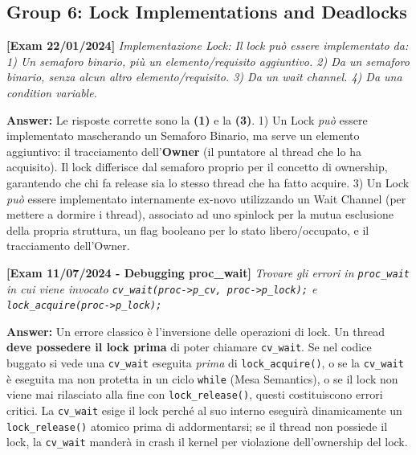 \newpage
\subsection*{Group 6: Lock Implementations and Deadlocks}

\textbf{[Exam 22/01/2024]}
\textit{Implementazione Lock: Il lock può essere implementato da: 1) Un semaforo binario, più un elemento/requisito aggiuntivo. 2) Da un semaforo binario, senza alcun altro elemento/requisito. 3) Da un wait channel. 4) Da una condition variable.}

\textbf{Answer:}
Le risposte corrette sono la \textbf{(1)} e la \textbf{(3)}.
1) Un Lock \textit{può} essere implementato mascherando un Semaforo Binario, ma serve un elemento aggiuntivo: il tracciamento dell'\textbf{Owner} (il puntatore al thread che lo ha acquisito). Il lock differisce dal semaforo proprio per il concetto di ownership, garantendo che chi fa release sia lo stesso thread che ha fatto acquire.
3) Un Lock \textit{può} essere implementato internamente ex-novo utilizzando un Wait Channel (per mettere a dormire i thread), associato ad uno spinlock per la mutua esclusione della propria struttura, un flag booleano per lo stato libero/occupato, e il tracciamento dell'Owner. 

\vspace{1em}

\textbf{[Exam 11/07/2024 - Debugging proc\_wait]}
\textit{Trovare gli errori in \texttt{proc\_wait} in cui viene invocato \texttt{cv\_wait(proc->p\_cv, proc->p\_lock);} e \texttt{lock\_acquire(proc->p\_lock);}}

\textbf{Answer:}
Un errore classico è l'inversione delle operazioni di lock. 
Un thread \textbf{deve possedere il lock prima} di poter chiamare \texttt{cv\_wait}. Se nel codice buggato si vede una \texttt{cv\_wait} eseguita \textit{prima} di \texttt{lock\_acquire()}, o se la \texttt{cv\_wait} è eseguita ma non protetta in un ciclo \texttt{while} (Mesa Semantics), o se il lock non viene mai rilasciato alla fine con \texttt{lock\_release()}, questi costituiscono errori critici. 
La \texttt{cv\_wait} esige il lock perché al suo interno eseguirà dinamicamente un \texttt{lock\_release()} atomico prima di addormentarsi; se il thread non possiede il lock, la \texttt{cv\_wait} manderà in crash il kernel per violazione dell'ownership del lock.
